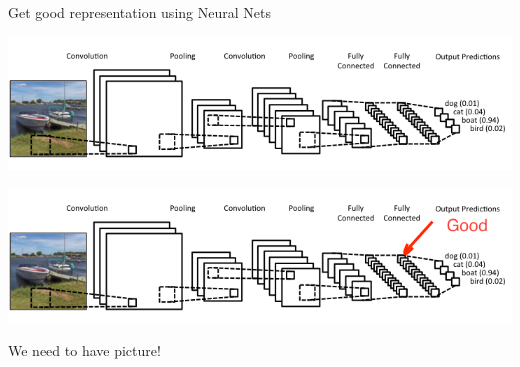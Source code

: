 \documentclass{beamer}
\begin{document}
\begin{frame}{Get good representation using Neural Nets}
	\begin{center}
		\includegraphics[scale=0.4]{img/cnn}
		
		\includegraphics[scale=0.4]{img/cnn_gr}
	\end{center}
	
	\begin{tcolorbox}[colback=gray!2, colframe=red!90, title=Problem]
		\centering We need to have picture!
	\end{tcolorbox}
\end{frame}
\end{document}
